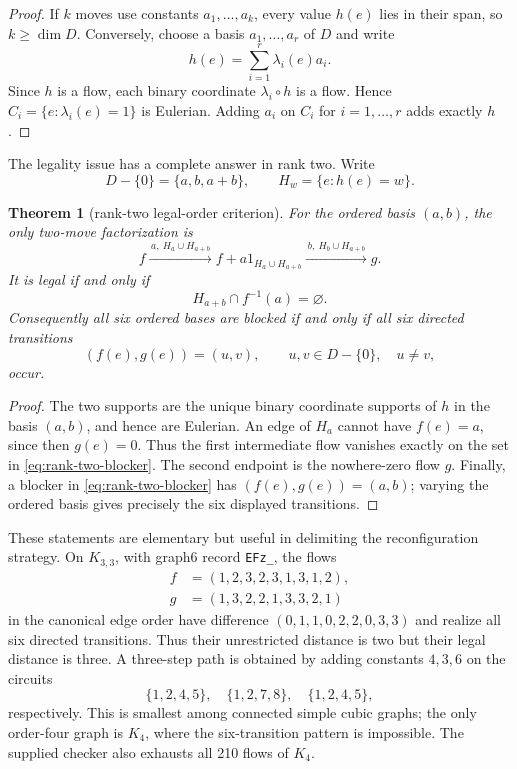 \documentclass[11pt]{article}
\newtheorem{theorem}{Theorem}[section]
\theoremstyle{definition}
\theoremstyle{remark}
\numberwithin{equation}{section}
\begin{document}
\begin{proof}
If \(k\) moves use constants \(a_1,\ldots,a_k\), every value \(h(e)\)
lies in their span, so \(k\geq\dim D\).  Conversely, choose a basis
\(a_1,\ldots,a_r\) of \(D\) and write
\[
 h(e)=\sum_{i=1}^r\lambda_i(e)a_i.
\]
Since \(h\) is a flow, each binary coordinate
\(\lambda_i\circ h\) is a flow.  Hence
\(C_i=\{e:\lambda_i(e)=1\}\) is Eulerian.  Adding \(a_i\) on \(C_i\)
for \(i=1,\ldots,r\) adds exactly \(h\).
\end{proof}

The legality issue has a complete answer in rank two.  Write
\[
 D-\{0\}=\{a,b,a+b\},\qquad H_w=\{e:h(e)=w\}.
\]

\begin{theorem}[rank-two legal-order criterion]\label{thm:rank-two}
For the ordered basis \((a,b)\), the only two-move factorization is
\[
 f\xrightarrow{\,a,\ H_a\cup H_{a+b}\,}
 f+a1_{H_a\cup H_{a+b}}
 \xrightarrow{\,b,\ H_b\cup H_{a+b}\,}g.
\]
It is legal if and only if
\begin{equation}\label{eq:rank-two-blocker}
                 H_{a+b}\cap f^{-1}(a)=\varnothing.
\end{equation}
Consequently all six ordered bases are blocked if and only if all six
directed transitions
\[
 (f(e),g(e))=(u,v),\qquad
 u,v\in D-\{0\},\quad u\ne v,
\]
occur.
\end{theorem}

\begin{proof}
The two supports are the unique binary coordinate supports of \(h\) in
the basis \((a,b)\), and hence are Eulerian.  An edge of \(H_a\) cannot
have \(f(e)=a\), since then \(g(e)=0\).  Thus the first intermediate
flow vanishes exactly on the set in
\eqref{eq:rank-two-blocker}.  The second endpoint is the nowhere-zero
flow \(g\).  Finally, a blocker in
\eqref{eq:rank-two-blocker} has
\((f(e),g(e))=(a,b)\); varying the ordered basis gives precisely the six
displayed transitions.
\end{proof}

These statements are elementary but useful in delimiting the
reconfiguration strategy.  On \(K_{3,3}\), with graph6 record
\texttt{EFz\_}, the flows
\[
\begin{split}
f&=(1,2,3,2,3,1,3,1,2),\\
g&=(1,3,2,2,1,3,3,2,1)
\end{split}
\]
in the canonical edge order have difference
\((0,1,1,0,2,2,0,3,3)\) and realize all six directed transitions.
Thus their unrestricted distance is two but their legal distance is
three.  A three-step path is obtained by adding constants \(4,3,6\)
on the circuits
\[
 \{1,2,4,5\},\quad \{1,2,7,8\},\quad \{1,2,4,5\},
\]
respectively.  This is smallest among connected simple cubic graphs;
the only order-four graph is \(K_4\), where the six-transition pattern
is impossible.  The supplied checker also exhausts all 210 flows of
\(K_4\).
\end{document}
